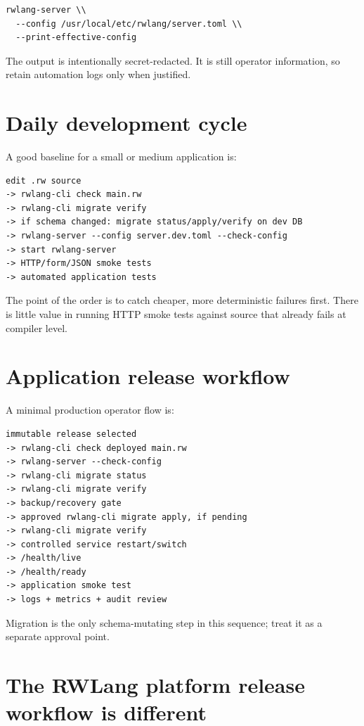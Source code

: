 \begin{lstlisting}
rwlang-server \\
  --config /usr/local/etc/rwlang/server.toml \\
  --print-effective-config
\end{lstlisting}

The output is intentionally secret-redacted. It is still operator information, so retain automation logs only when justified.

\section{Daily development cycle}

A good baseline for a small or medium application is:

\begin{lstlisting}
edit .rw source
-> rwlang-cli check main.rw
-> rwlang-cli migrate verify
-> if schema changed: migrate status/apply/verify on dev DB
-> rwlang-server --config server.dev.toml --check-config
-> start rwlang-server
-> HTTP/form/JSON smoke tests
-> automated application tests
\end{lstlisting}

The point of the order is to catch cheaper, more deterministic failures first. There is little value in running HTTP smoke tests against source that already fails at compiler level.

\section{Application release workflow}

A minimal production operator flow is:

\begin{lstlisting}
immutable release selected
-> rwlang-cli check deployed main.rw
-> rwlang-server --check-config
-> rwlang-cli migrate status
-> rwlang-cli migrate verify
-> backup/recovery gate
-> approved rwlang-cli migrate apply, if pending
-> rwlang-cli migrate verify
-> controlled service restart/switch
-> /health/live
-> /health/ready
-> application smoke test
-> logs + metrics + audit review
\end{lstlisting}

Migration  is the only schema-mutating step in this sequence; treat it as a separate approval point.

\section{The RWLang platform release workflow is different}

